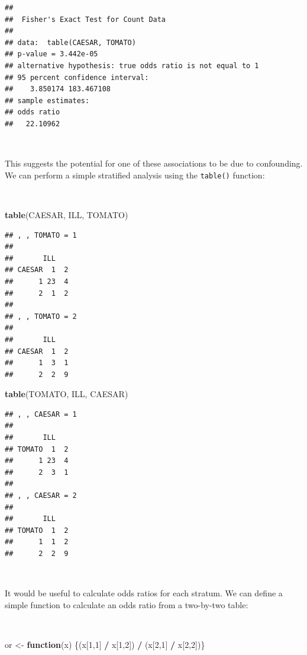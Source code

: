 \documentclass[12pt,a4paper]{book}
\newenvironment{Shaded}{\begin{snugshade}}{\end{snugshade}}
\newcommand{\KeywordTok}[1]{\textcolor[rgb]{0.13,0.29,0.53}{\textbf{#1}}}
\newcommand{\DecValTok}[1]{\textcolor[rgb]{0.00,0.00,0.81}{#1}}
\newcommand{\StringTok}[1]{\textcolor[rgb]{0.31,0.60,0.02}{#1}}
\newcommand{\ControlFlowTok}[1]{\textcolor[rgb]{0.13,0.29,0.53}{\textbf{#1}}}
\newcommand{\OperatorTok}[1]{\textcolor[rgb]{0.81,0.36,0.00}{\textbf{#1}}}
\newcommand{\NormalTok}[1]{#1}
\theoremstyle{definition}
\theoremstyle{definition}
\theoremstyle{definition}
\theoremstyle{remark}
\begin{document}
\begin{verbatim}
## 
##  Fisher's Exact Test for Count Data
## 
## data:  table(CAESAR, TOMATO)
## p-value = 3.442e-05
## alternative hypothesis: true odds ratio is not equal to 1
## 95 percent confidence interval:
##    3.850174 183.467108
## sample estimates:
## odds ratio 
##   22.10962
\end{verbatim}

~

This suggests the potential for one of these associations to be due to
confounding. We can perform a simple stratified analysis using the
\texttt{table()} function:

~

\begin{Shaded}
\begin{Highlighting}[]
\KeywordTok{table}\NormalTok{(CAESAR, ILL, TOMATO)}
\end{Highlighting}
\end{Shaded}

\begin{verbatim}
## , , TOMATO = 1
## 
##       ILL
## CAESAR  1  2
##      1 23  4
##      2  1  2
## 
## , , TOMATO = 2
## 
##       ILL
## CAESAR  1  2
##      1  3  1
##      2  2  9
\end{verbatim}

\newpage

\begin{Shaded}
\begin{Highlighting}[]
\KeywordTok{table}\NormalTok{(TOMATO, ILL, CAESAR)}
\end{Highlighting}
\end{Shaded}

\begin{verbatim}
## , , CAESAR = 1
## 
##       ILL
## TOMATO  1  2
##      1 23  4
##      2  3  1
## 
## , , CAESAR = 2
## 
##       ILL
## TOMATO  1  2
##      1  1  2
##      2  2  9
\end{verbatim}

~

It would be useful to calculate odds ratios for each stratum. We can
define a simple function to calculate an odds ratio from a two-by-two
table:

~

\begin{Shaded}
\begin{Highlighting}[]
\NormalTok{or <-}\StringTok{ }\ControlFlowTok{function}\NormalTok{(x) \{(x[}\DecValTok{1}\NormalTok{,}\DecValTok{1}\NormalTok{] }\OperatorTok{/}\StringTok{ }\NormalTok{x[}\DecValTok{1}\NormalTok{,}\DecValTok{2}\NormalTok{]) }\OperatorTok{/}\StringTok{ }\NormalTok{(x[}\DecValTok{2}\NormalTok{,}\DecValTok{1}\NormalTok{] }\OperatorTok{/}\StringTok{ }\NormalTok{x[}\DecValTok{2}\NormalTok{,}\DecValTok{2}\NormalTok{])\}}
\end{Highlighting}
\end{Shaded}
\end{document}
